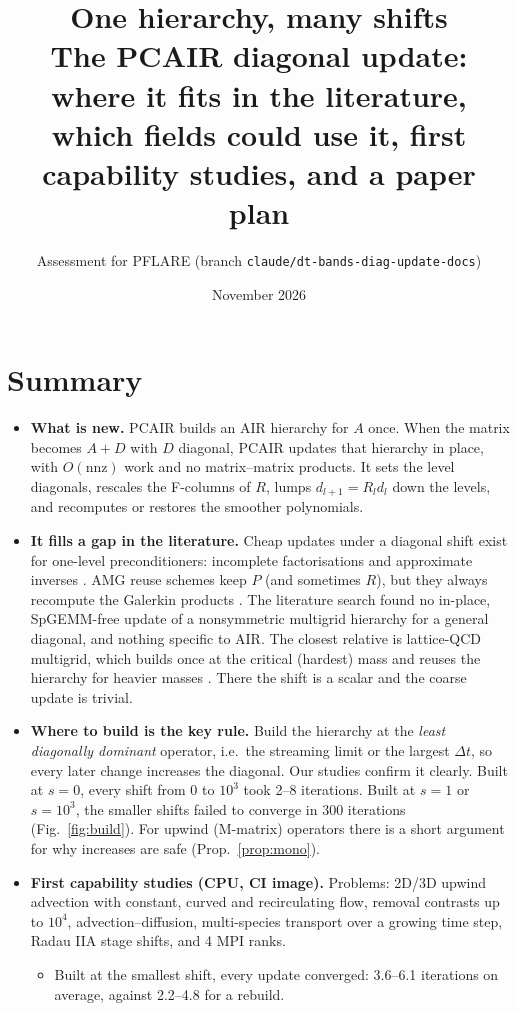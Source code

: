 \documentclass[11pt,a4paper]{article}
\title{One hierarchy, many shifts\\[4pt]
\large The PCAIR diagonal update: where it fits in the literature,\\
which fields could use it, first capability studies, and a paper plan}
\author{Assessment for PFLARE (branch \texttt{claude/dt-bands-diag-update-docs})}
\date{November 2026}
\begin{document}
\maketitle

\section*{Summary}
\begin{itemize}
\item \textbf{What is new.} PCAIR builds an AIR hierarchy for $A$ once. When the matrix becomes $A+D$ with $D$ diagonal, PCAIR updates that hierarchy in place, with $O(\mathrm{nnz})$ work and no matrix--matrix products. It sets the level diagonals, rescales the F-columns of $R$, lumps $d_{l+1}=R_l d_l$ down the levels, and recomputes or restores the smoother polynomials.
\item \textbf{It fills a gap in the literature.} Cheap updates under a diagonal shift exist for one-level preconditioners: incomplete factorisations and approximate inverses \cite{Meurant01,BenziBert03,Bert04,DTT07,BBM11,BertDur16}. AMG reuse schemes keep $P$ (and sometimes $R$), but they always recompute the Galerkin products \cite{Demidov21,MueLuReuse}. The literature search found no in-place, SpGEMM-free update of a nonsymmetric multigrid hierarchy for a general diagonal, and nothing specific to AIR. The closest relative is lattice-QCD multigrid, which builds once at the critical (hardest) mass and reuses the hierarchy for heavier masses \cite{Babich10}. There the shift is a scalar and the coarse update is trivial.
\item \textbf{Where to build is the key rule.} Build the hierarchy at the \emph{least diagonally dominant} operator, i.e.\ the streaming limit or the largest $\Delta t$, so every later change increases the diagonal. Our studies confirm it clearly. Built at $s=0$, every shift from $0$ to $10^3$ took 2--8 iterations. Built at $s=1$ or $s=10^3$, the smaller shifts failed to converge in 300 iterations (Fig.~\ref{fig:build}). For upwind (M-matrix) operators there is a short argument for why increases are safe (Prop.~\ref{prop:mono}).
\item \textbf{First capability studies (CPU, CI image).} Problems: 2D/3D upwind advection with constant, curved and recirculating flow, removal contrasts up to $10^4$, advection--diffusion, multi-species transport over a growing time step, Radau IIA stage shifts, and 4 MPI ranks.
  \begin{itemize}
  \item Built at the smallest shift, every update converged: 3.6--6.1 iterations on average, against 2.2--4.8 for a rebuild.

\end{itemize}
\end{itemize}
\end{document}

